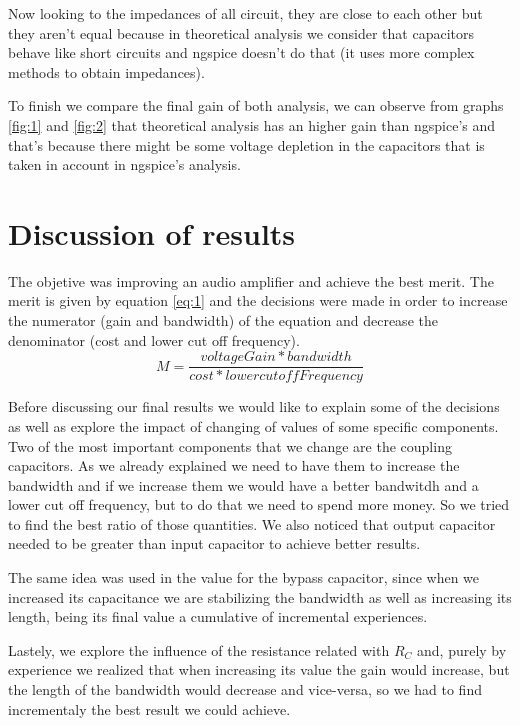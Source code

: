 Now looking to the impedances of all circuit, they are close to each other but they aren't equal because in theoretical analysis we consider that capacitors behave like 
short circuits and ngspice doesn't do that (it uses more complex methods to obtain impedances).

To finish we compare the final gain of both analysis, we can observe from graphs \ref{fig:1} and \ref{fig:2} that theoretical analysis has an higher gain than ngspice's 
and that's because there might be some voltage depletion in the capacitors that is taken in account in ngspice's analysis.

\newpage
\section{Discussion of results}
\label {sec:aspects}

The objetive was improving an audio amplifier and achieve the best merit. The merit is given by equation \ref{eq:1} and the decisions were made in order to increase the 
numerator (gain and bandwidth) of the equation and decrease the denominator (cost and lower cut off frequency).
\begin{equation}
M=\frac{voltageGain*bandwidth}{cost*lowercutoffFrequency}
\label{eq:1}
\end{equation}

Before discussing our final results we would like to explain some of the decisions as well as explore the impact of changing of values of some specific components.
Two of the most important components that we change are the coupling capacitors. As we already explained we need to have them to increase the bandwidth and if we increase 
them we would have a better bandwitdh and a lower cut off frequency, but to do that we need to spend more money. So we tried to find the best ratio of those quantities.
We also noticed that output capacitor needed to be greater than input capacitor to achieve better results. 

The same idea was used in the value for the bypass capacitor, since when we increased its capacitance we are stabilizing the bandwidth as well as increasing its length,
being its final value a cumulative of incremental experiences. 

Lastely, we explore the influence of the resistance related with $R_{C}$ and, purely by experience we realized that when increasing its value the gain would increase, but
the length of the bandwidth would decrease and vice-versa, so we had to find incrementaly the best result we could achieve.

